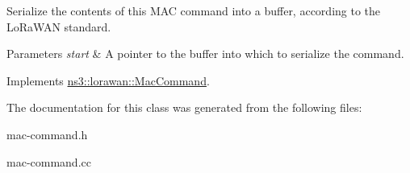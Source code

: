 Serialize the contents of this M\+AC command into a buffer, according to the Lo\+Ra\+W\+AN standard.


\begin{DoxyParams}{Parameters}
{\em start} & A pointer to the buffer into which to serialize the command. \\
\hline
\end{DoxyParams}


Implements \hyperlink{classns3_1_1lorawan_1_1MacCommand_a0ed44b33942ddc3dc9694dc06ab0b87f}{ns3\+::lorawan\+::\+Mac\+Command}.



The documentation for this class was generated from the following files\+:\begin{DoxyCompactItemize}
\item 
mac-\/command.\+h\item 
mac-\/command.\+cc\end{DoxyCompactItemize}
